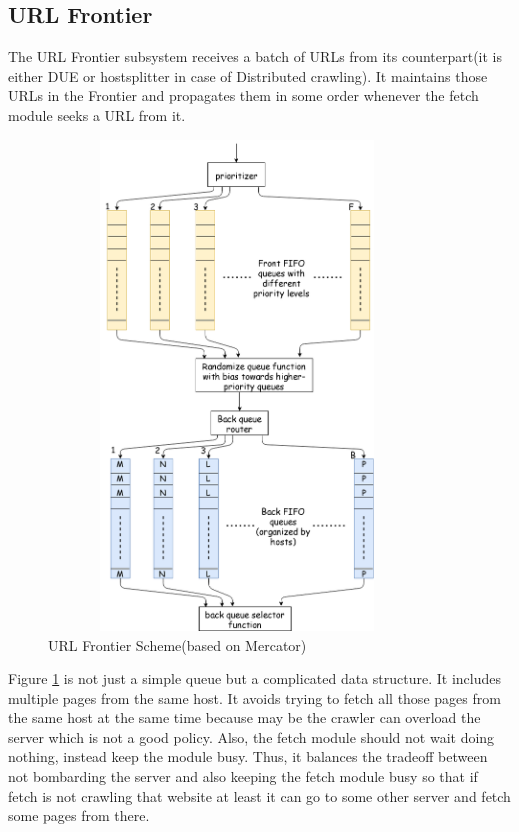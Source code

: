 \subsection{URL Frontier}
The URL Frontier subsystem receives a batch of URLs from its counterpart(it is either DUE or hostsplitter in case of Distributed crawling). It maintains those URLs in the Frontier and propagates them in some order whenever the fetch module seeks a URL from it.

\begin{figure}[h!]
  \centering
  \includegraphics[width=10cm,height=13cm,keepaspectratio]{../media/crawler/url-frontier.png}
  \caption{URL Frontier Scheme(based on Mercator)}
  \label{fig:frontier}
\end{figure}

\noindent
Figure \ref{fig:frontier} is not just a simple queue but a complicated data structure. It includes multiple pages from the same host. It avoids trying to fetch all those pages from the same host at the same time because may be the crawler can overload the server which is not a good policy. Also, the fetch module should not wait doing nothing, instead keep the module busy. Thus, it balances the tradeoff between not
bombarding the server and also keeping the fetch module busy so that if fetch is not crawling that website
at least it can go to some other server and fetch some pages from there.

